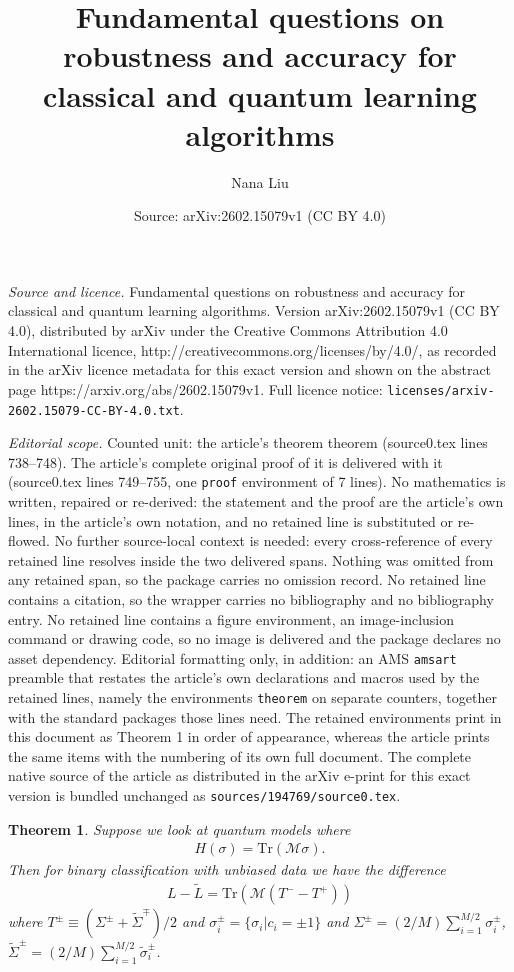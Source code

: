 \documentclass[10pt,a4paper]{amsart}
\title{Fundamental questions on robustness and accuracy for classical and quantum learning algorithms}
\author{Nana Liu}
\date{Source: arXiv:2602.15079v1 (CC BY 4.0)}
\newtheorem{theorem}{Theorem}
\begin{document}
\maketitle

\noindent\emph{Source and licence.} Fundamental questions on robustness and accuracy for classical and quantum learning algorithms. Version arXiv:2602.15079v1 (CC BY 4.0), distributed by arXiv under the Creative Commons Attribution 4.0 International licence, http://creativecommons.org/licenses/by/4.0/, as recorded in the arXiv licence metadata for this exact version and shown on the abstract page https://arxiv.org/abs/2602.15079v1. Full licence notice: \texttt{licenses/arxiv-2602.15079-CC-BY-4.0.txt}.\par\smallskip

\noindent\textit{Editorial scope.} Counted unit: the article's theorem theorem (source0.tex lines 738--748). The article's complete original proof of it is delivered with it (source0.tex lines 749--755, one \texttt{proof} environment of 7 lines). No mathematics is written, repaired or re-derived: the statement and the proof are the article's own lines, in the article's own notation, and no retained line is substituted or re-flowed.  No further source-local context is needed: every cross-reference of every retained line resolves inside the two delivered spans.  Nothing was omitted from any retained span, so the package carries no omission record.  No retained line contains a citation, so the wrapper carries no bibliography and no bibliography entry.  No retained line contains a figure environment, an image-inclusion command or drawing code, so no image is delivered and the package declares no asset dependency.  Editorial formatting only, in addition: an AMS \texttt{amsart} preamble that restates the article's own declarations and macros used by the retained lines, namely the environments \texttt{theorem} on separate counters, together with the standard packages those lines need.  The retained environments print in this document as Theorem 1 in order of appearance, whereas the article prints the same items with the numbering of its own full document.  The complete native source of the article as distributed in the arXiv e-print for this exact version is bundled unchanged as \texttt{sources/194769/source0.tex}.
\begin{theorem}
Suppose we look at quantum models where
\begin{align}
    H(\sigma)=\text{Tr}(\mathcal{M}\sigma).
\end{align}
Then for binary classification with unbiased data we have the difference
\begin{align}
    L-\tilde{L}=\text{Tr}(\mathcal{M}(T^--T^+))
\end{align}
where $T^{\pm} \equiv (\Sigma^{\pm}+\tilde{\Sigma}^{\mp})/2$ and $\sigma_i^{\pm}=\{\sigma_i \vert c_i=\pm 1\}$ and $\Sigma^{\pm}=(2/M)\sum_{i=1}^{M/2}\sigma_i^{\pm}$, $\tilde{\Sigma}^{\pm}=(2/M)\sum_{i=1}^{M/2}\tilde{\sigma}_i^{\pm}$. 
\end{theorem}
\end{document}
